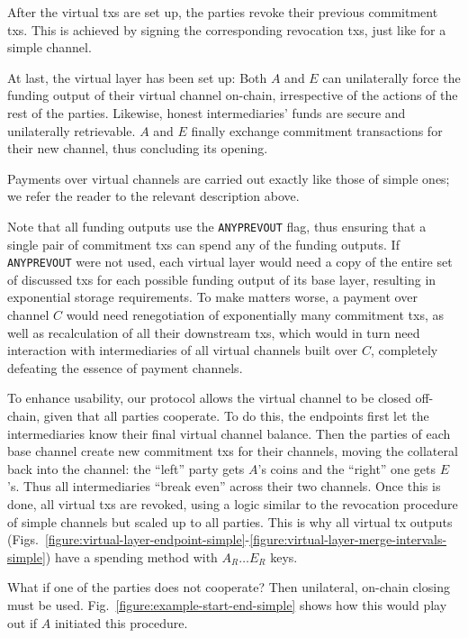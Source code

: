   After the virtual txs are set up, the parties revoke their previous commitment
  txs. This is achieved by signing the corresponding revocation txs, just like
  for a simple channel.

  At last, the virtual layer has been set up: Both $A$ and $E$ can unilaterally
  force the funding output of their virtual channel on-chain, irrespective of
  the actions of the rest of the parties. Likewise, honest intermediaries' funds
  are secure and unilaterally retrievable. $A$ and $E$ finally exchange
  commitment transactions for their new channel, thus concluding its opening.

  Payments over virtual channels are carried out exactly like those of simple
  ones; we refer the reader to the relevant description above.

  Note that all funding outputs use the \texttt{ANYPREVOUT} flag, thus ensuring
  that a single pair of commitment txs can spend any of the funding outputs. If
  \texttt{ANYPREVOUT} were not used, each virtual layer would need a copy of the
  entire set of discussed txs for each possible funding output of its base
  layer, resulting in exponential storage requirements. To make matters worse,
  a payment over channel $C$ would need renegotiation of exponentially many
  commitment txs, as well as recalculation of all their downstream txs, which
  would in turn need interaction with intermediaries of all virtual channels
  built over $C$, completely defeating the essence of payment channels.

  To enhance usability, our protocol allows the virtual channel to be closed
  off-chain, given that all parties cooperate. To do this, the endpoints first
  let the intermediaries know their final virtual channel balance. Then the
  parties of each base channel create new commitment txs for their channels,
  moving the collateral back into the channel: the ``left'' party gets $A$'s
  coins and the ``right'' one gets $E$'s. Thus all intermediaries ``break even''
  across their two channels. Once this is done, all virtual txs are revoked,
  using a logic similar to the revocation procedure of simple channels but
  scaled up to all parties. This is why all virtual tx outputs
  (Figs.~\ref{figure:virtual-layer-endpoint-simple}-\ref{figure:virtual-layer-merge-intervals-simple})
  have a spending method with $A_R \dots E_R$ keys.

  What if one of the parties does not cooperate? Then unilateral, on-chain
  closing must be used. Fig.~\ref{figure:example-start-end-simple} shows how
  this would play out if $A$ initiated this procedure.

